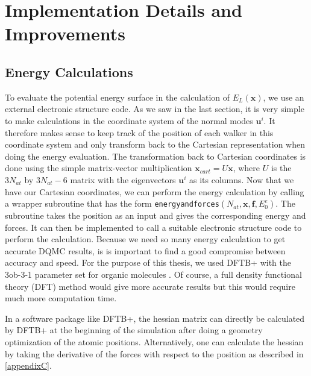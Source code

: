 \documentclass [12pt]{report}
\begin{document}
\section{Implementation Details and Improvements}
\subsection{Energy Calculations}
To evaluate the potential energy surface in the calculation of $E_L(\bm{x})$, we use an external electronic structure code. As we saw in the last section, it is very simple to make calculations in the coordinate system of the normal modes $\bm{u}^i$. It therefore makes sense to keep track of the position of each walker in this coordinate system and only transform back to the Cartesian representation when doing the energy evaluation. The transformation back to Cartesian coordinates is done using the simple matrix-vector multiplication $\bm{x}_{cart} = U\bm{x}$, where $U$ is the $3N_{at}$ by $3N_{at} - 6$ matrix with the eigenvectors $\bm{u}^i$ as its columns. Now that we have our Cartesian coordinates, we can perform the energy calculation by calling a wrapper subroutine that has the form \verb+energyandforces+$(N_{at},\bm{x},\bm{f},E^e_0)$. The subroutine takes the position as an input and gives the corresponding energy and forces. It can then be implemented to call a suitable electronic structure code to perform the calculation. Because we need so many energy calculation to get accurate DQMC results, is is important to find a good compromise between accuracy and speed. For the purpose of this thesis, we used DFTB+ \cite{dftbp,dftbp2} with the 3ob-3-1 parameter set for organic molecules \cite{3ob-3-1}. Of course, a full density functional theory (DFT) method would give more accurate results but this would require much more computation time.

In a software package like DFTB+, the hessian matrix can directly be calculated by DFTB+ at the beginning of the simulation after doing a geometry optimization of the atomic positions. Alternatively, one can calculate the hessian by taking the derivative of the forces with respect to the position as described in \ref{appendixC}.
\end{document}
